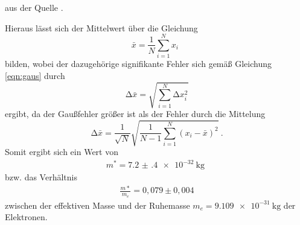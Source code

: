 aus der Quelle \cite{pdg}.

Hieraus lässt sich der Mittelwert über die Gleichung
\begin{equation}
  \bar{x} = \frac{1}{N} \sum_{i=1}^{N} x_i \: \:
  \label{eqn:mit}
\end{equation}
\noindent bilden, wobei der dazugehörige signifikante Fehler sich gemäß Gleichung \eqref{eqn:gaus} durch
\begin{equation}
  \increment \bar{x} = \sqrt{\sum_{i=1}^N \increment x_i^2}
  \label{eqn:mitf}
\end{equation}
ergibt, da der Gaußfehler größer ist als der Fehler durch die Mittelung
\begin{equation}
  \increment \bar{x} = \frac{1}{\sqrt{N}} \sqrt{ \frac{1}{N-1} \sum_{i=1}^N
  (x_i - \bar{x})^2} \: .
  \label{eqn:mitf}
\end{equation}
Somit ergibt sich ein Wert von
\begin{align*}
  m^*=\SI{7.2(4)e-32}{\kilo\gram} \: \,
\end{align*}
bzw. das Verhältnis
\begin{align*}
  \frac{m*}{m_e}=0,079\pm0,004
\end{align*}
zwischen der effektiven Masse und der Ruhemasse $m_e=\SI{9.109e-31}{\kilo\gram}$ der Elektronen.

